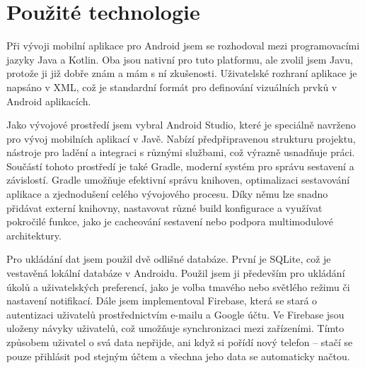 \chapter{Použité technologie}
\hspace{14pt} Při vývoji mobilní aplikace pro Android jsem se rozhodoval mezi programovacími jazyky Java a Kotlin. Oba jsou nativní pro tuto platformu, ale zvolil jsem Javu, protože ji již dobře znám a mám s ní zkušenosti. Uživatelské rozhraní aplikace je napsáno v XML, což je standardní formát pro definování vizuálních prvků v Android aplikacích.  

Jako vývojové prostředí jsem vybral Android Studio, které je speciálně navrženo pro vývoj mobilních aplikací v Javě. Nabízí předpřipravenou strukturu projektu, nástroje pro ladění a integraci s různými službami, což výrazně usnadňuje práci. Součástí tohoto prostředí je také Gradle, moderní systém pro správu sestavení a závislostí. Gradle umožňuje efektivní správu knihoven, optimalizaci sestavování aplikace a zjednodušení celého vývojového procesu. Díky němu lze snadno přidávat externí knihovny, nastavovat různé build konfigurace a využívat pokročilé funkce, jako je cacheování sestavení nebo podpora multimodulové architektury.  

Pro ukládání dat jsem použil dvě odlišné databáze. První je SQLite, což je vestavěná lokální databáze v Androidu. Použil jsem ji především pro ukládání úkolů a uživatelských preferencí, jako je volba tmavého nebo světlého režimu či nastavení notifikací. Dále jsem implementoval Firebase, která se stará o autentizaci uživatelů prostřednictvím e-mailu a Google účtu. Ve Firebase jsou uloženy návyky uživatelů, což umožňuje synchronizaci mezi zařízeními. Tímto způsobem uživatel o svá data nepřijde, ani když si pořídí nový telefon – stačí se pouze přihlásit pod stejným účtem a všechna jeho data se automaticky načtou.
